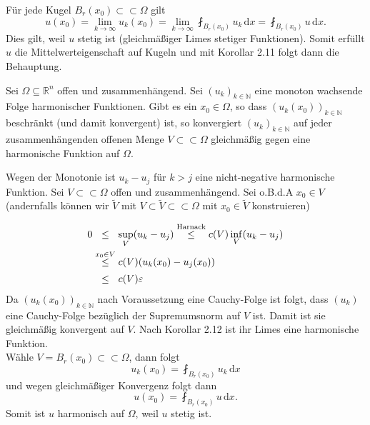 \begin{beweis}
	Für jede Kugel $B_r(x_0) \subset \subset \Omega$ gilt 
	\[
		u(x_0)= \lim_{k \to \infty}u_k(x_0) = \lim_{k \to \infty} \fint_{B_r(x_0)}^{}u_k \,\mathrm{d}x = \fint_{B_r(x_0)}^{}u \,\mathrm{d}x.
	\]
	Dies gilt, weil $u$ stetig ist (gleichmäßiger Limes stetiger Funktionen). 
	Somit erfüllt $u$ die Mittelwerteigenschaft auf Kugeln und mit Korollar 2.11 folgt dann die Behauptung.
\end{beweis}

\begin{korollar}
	Sei $\Omega \subseteq \mathbb{R}^n$ offen und zusammenhängend. Sei $(u_k)_{k \in \mathbb{N}}$ eine monoton wachsende Folge harmonischer Funktionen. 
	Gibt es ein $x_0 \in \Omega$, so dass $(u_k(x_0))_{k \in \mathbb{N}}$ beschränkt (und damit konvergent) ist, so konvergiert $(u_k)_{k \in \mathbb{N}}$ auf jeder
	zusammenhängenden offenen Menge $V \subset \subset \Omega$ gleichmäßig gegen eine harmonische Funktion auf $\Omega$.
\end{korollar}

\begin{beweis}
	Wegen der Monotonie ist $u_k-u_j$ für $k > j$ eine nicht-negative harmonische Funktion. Sei $V \subset \subset \Omega$ offen und zusammenhängend. 
	Sei o.B.d.A $x_0 \in V$ (andernfalls können wir $ \tilde V$ mit $V \subset \tilde V \subset \subset \Omega$ mit $x_0 \in \tilde V$ konstruieren)
	
	
	\begin{align*}
		0 &\stackrel{\hphantom{x_0 \in V}}{\leq} \sup_V(u_k-u_j) \stackrel{\text{Harnack}}{\leq} c(V) \inf_V(u_k-u_j) \\
		& \stackrel{x_0 \in V}{\leq} c(V) (u_k(x_0)-u_j(x_0)) \\
		&\stackrel{\hphantom{x_0 \in V}}{\leq} c(V) \varepsilon
	\end{align*}
	Da $(u_k(x_0))_{k \in \mathbb{N}}$ nach Voraussetzung eine Cauchy-Folge ist folgt, dass $(u_k)$ eine Cauchy-Folge bezüglich der Supremumsnorm auf $V$ ist. 
	Damit ist sie gleichmäßig konvergent auf $V$. Nach Korollar 2.12 ist ihr Limes eine harmonische Funktion. \\
	Wähle $V = B_r(x_0) \subset \subset \Omega$, dann folgt
	\begin{equation}
		u_k(x_0) = \fint_{B_r(x_0)}^{}u_k \,\mathrm{d}x 
	\end{equation}
	und wegen gleichmäßiger Konvergenz folgt dann
	\begin{equation}
	u(x_0) = \fint_{B_r(x_0)}^{}u \,\mathrm{d}x.
	\end{equation}
	Somit ist $u$ harmonisch auf $\Omega$, weil $u$ stetig ist.
\end{beweis}

